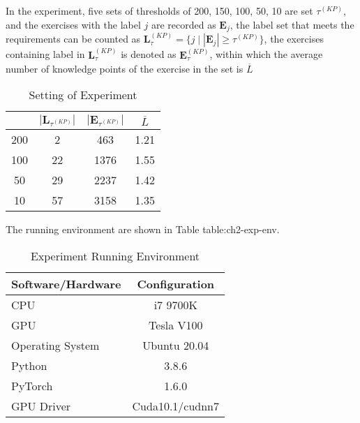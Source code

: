 In the experiment, five sets of thresholds of 200, 150, 100, 50, 10 are set \(\tau^{(KP)} \), and the exercises with the label \(j\) are recorded as \(\mathbf{E}_j\), the label set that meets the requirements can be counted as \(\mathbf{L}_\tau^{(KP)}=\{j\mid |\mathbf{E}_j|\geq\tau^{(KP)}\} \), the exercises containing label in \(\mathbf{L}_\tau^{(KP)} \) is denoted as \(\mathbf{E}_\tau^{(KP)} \), within which the average number of knowledge points of the exercise in the set is \(\overline{L}\)

\begin{table}[H]
	\centering
	\caption{Setting of Experiment}\label{tbl:ch2-ex1}
	\begin{tabular}{cccc}%
		\toprule
		\text{\(\tau^{(KP)} \)} & \(|\mathbf{L}_{\tau^{(KP)}}|\) & \(|\mathbf{E}_{\tau^{(KP)}}| \) & \(\overline{L}\) \\
		\midrule
		200                     & 2                              & 463                             & 1.21             \\
		100                     & 22                             & 1376                            & 1.55             \\
		50                      & 29                             & 2237                            & 1.42             \\
		10                      & 57                             & 3158                            & 1.35             \\
		\bottomrule
	\end{tabular}
\end{table}

The running environment are shown in Table {table:ch2-exp-env}.

\begin{table}[htbp]
	\caption{Experiment Running Environment}\label{table:ch2-exp-env}
	\centering
	\begin{tabular}{l c}
		\toprule
		Software/Hardware & Configuration   \\
		\midrule
		CPU               & i7 9700K        \\

		GPU               & Tesla V100      \\

		Operating System  & Ubuntu 20.04    \\

		Python            & 3.8.6           \\

		PyTorch           & 1.6.0           \\

		GPU Driver        & Cuda10.1/cudnn7 \\
		\bottomrule
	\end{tabular}
\end{table}


